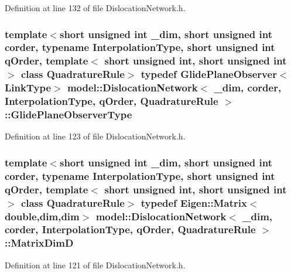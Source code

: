 Definition at line 132 of file Dislocation\+Network.\+h.

\hypertarget{classmodel_1_1_dislocation_network_a165910ccdf54b1bb2956b669a75cea2a}{}
\subsubsection[{Glide\+Plane\+Observer\+Type}]{\setlength{\rightskip}{0pt plus 5cm}template$<$short unsigned int \+\_\+dim, short unsigned int corder, typename Interpolation\+Type, short unsigned int q\+Order, template$<$ short unsigned int, short unsigned int $>$ class Quadrature\+Rule$>$ typedef {\bf Glide\+Plane\+Observer}$<${\bf Link\+Type}$>$ {\bf model\+::\+Dislocation\+Network}$<$ \+\_\+dim, corder, Interpolation\+Type, q\+Order, Quadrature\+Rule $>$\+::{\bf Glide\+Plane\+Observer\+Type}}\label{classmodel_1_1_dislocation_network_a165910ccdf54b1bb2956b669a75cea2a}


Definition at line 123 of file Dislocation\+Network.\+h.

\hypertarget{classmodel_1_1_dislocation_network_a9660c892fa8d51215f776fc13f073502}{}
\subsubsection[{Matrix\+Dim\+D}]{\setlength{\rightskip}{0pt plus 5cm}template$<$short unsigned int \+\_\+dim, short unsigned int corder, typename Interpolation\+Type, short unsigned int q\+Order, template$<$ short unsigned int, short unsigned int $>$ class Quadrature\+Rule$>$ typedef Eigen\+::\+Matrix$<$double,{\bf dim},{\bf dim}$>$ {\bf model\+::\+Dislocation\+Network}$<$ \+\_\+dim, corder, Interpolation\+Type, q\+Order, Quadrature\+Rule $>$\+::{\bf Matrix\+Dim\+D}}\label{classmodel_1_1_dislocation_network_a9660c892fa8d51215f776fc13f073502}


Definition at line 121 of file Dislocation\+Network.\+h.

\hypertarget{classmodel_1_1_dislocation_network_aab58d4d3eea7aaa963a2ae6b081a5ecf}{}
